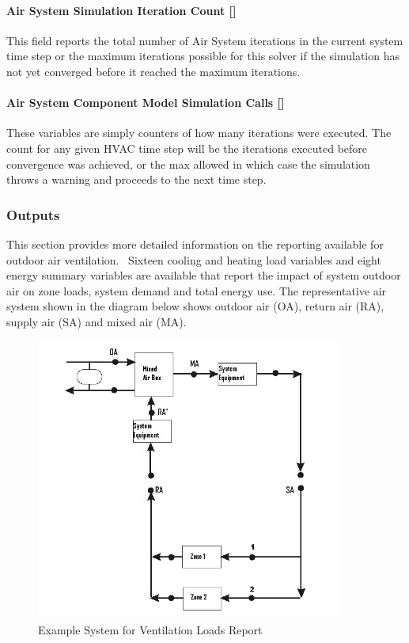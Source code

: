 \paragraph{Air System Simulation Iteration Count {[]}}\label{air-system-simulation-iteration-count}
This field reports the total number of Air System iterations in the current system time step or the maximum iterations possible for this solver if the simulation has not yet converged before it reached the maximum iterations.

\paragraph{Air System Component Model Simulation Calls {[]}}\label{air-system-component-model-simulation-calls}

These variables are simply counters of how many iterations were executed. The count for any given HVAC time step will be the iterations executed before convergence was achieved, or the max allowed in which case the simulation throws a warning and proceeds to the next time step.

\subsubsection{Outputs}\label{outputs-1-001}

This section provides more detailed information on the reporting available for outdoor air ventilation.~ Sixteen cooling and heating load variables and eight energy summary variables are available that report the impact of system outdoor air on zone loads, system demand and total energy use. The representative air system shown in the diagram below shows outdoor air (OA), return air (RA), supply air (SA) and mixed air (MA).

\begin{figure}[hbtp] %
\centering
\includegraphics[width=0.9\textwidth, height=0.9\textheight, keepaspectratio=true]{media/image209.png}
\caption{Example System for Ventilation Loads Report \protect \label{fig:example-system-for-ventilation-loads-report}}
\end{figure}


